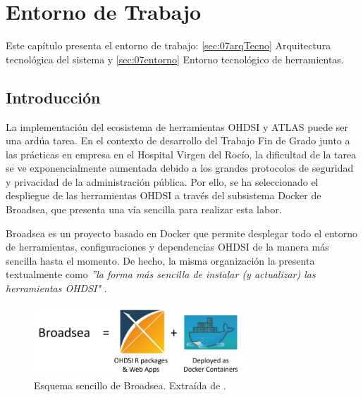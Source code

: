 \chapter{Entorno de Trabajo}\label{cap:07diseño}

Este capítulo presenta el entorno de trabajo: \ref{sec:07arqTecno} Arquitectura tecnológica del sistema y \ref{sec:07entorno} Entorno tecnológico de herramientas.

\section{Introducción}

La implementación del ecosistema de herramientas OHDSI y ATLAS puede ser una ardúa tarea. En el contexto de desarrollo del Trabajo Fin de Grado junto a las prácticas en empresa en el Hospital Virgen del Rocío, la dificultad de la tarea se ve exponencialmente aumentada debido a los grandes protocolos de seguridad y privacidad de la administración pública. Por ello, se ha seleccionado el despliegue de las herramientas OHDSI a través del subsistema Docker de Broadsea, que presenta una vía sencilla para realizar esta labor. 

Broadsea es un proyecto basado en Docker que permite desplegar todo el entorno de herramientas, configuraciones y dependencias OHDSI de la manera más sencilla hasta el momento. De hecho, la misma organización la presenta textualmente como \textit{''la forma más sencilla de instalar (y actualizar) las herramientas OHDSI"} \cite{Broadsea3PDF}. 

\begin{figure}[H]
    \centering
    \includegraphics[width=0.70\textwidth]{figures/broadseaEq.png}
    \caption{Esquema sencillo de Broadsea. Extraída de \cite{Broadsea3PPTX}.}
    \label{fig:broadseaEq}
\end{figure}

